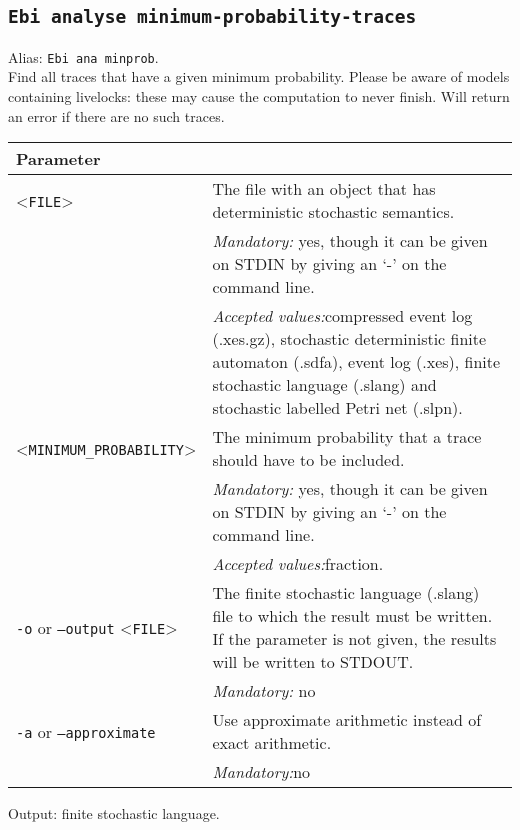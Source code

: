 {\subsection{\texttt{Ebi analyse minimum-probability-traces}}
\label{command:Ebi analyse minimum-probability-traces}
Alias: \texttt{Ebi ana minprob}.\\
Find all traces that have a given minimum probability.
Please be aware of models containing livelocks: these may cause the computation to never finish.
Will return an error if there are no such traces.\\
\begin{tabularx}{\linewidth}{lX}
\toprule
Parameter \\\midrule
<\texttt{FILE}>&The file with an object that has deterministic stochastic semantics.\\
&\textit{Mandatory:} \quad yes, though it can be given on STDIN by giving an `-' on the command line.\\
&\textit{Accepted values:}\quad compressed event log (.xes.gz), stochastic deterministic finite automaton (.sdfa), event log (.xes), finite stochastic language (.slang) and stochastic labelled Petri net (.slpn).\\
<\texttt{MINIMUM\_PROBABILITY}>&The minimum probability that a trace should have to be included.\\
&\textit{Mandatory:} \quad yes, though it can be given on STDIN by giving an `-' on the command line.\\
&\textit{Accepted values:}\quad fraction.\\
\texttt{-o} or \texttt{--output} <\texttt{FILE}> &
The finite stochastic language (.slang) file to which the result must be written. If the parameter is not given, the results will be written to STDOUT.\\
&\textit{Mandatory:} \quad no\\
\texttt{-a} or \texttt{--approximate} & Use approximate arithmetic instead of exact arithmetic.\\
&\textit{Mandatory:}\quad no\\
\bottomrule
\end{tabularx}
Output: finite stochastic language.
}
